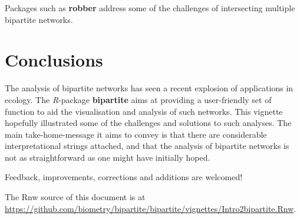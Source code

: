 \documentclass[a4paper, 11pt]{article}\usepackage[]{graphicx}\usepackage[dvipsnames]{xcolor}
\newcommand{\package}[1]{\textbf{#1}}
\newcommand{\proglang}[1]{\textsl{#1}}
\begin{document}
Packages such as \package{robber} address some of the challenges of intersecting multiple bipartite networks.

\section*{Conclusions}%
The analysis of bipartite networks has seen a recent explosion of applications in ecology. The \proglang{R}-package \package{bipartite} aims at providing a user-friendly set of function to aid the visualisation and analysis of such networks. This vignette hopefully illustrated some of the challenges and solutions to such analyses. The main take-home-message it aims to convey is that there are considerable interpretational strings attached, and that the analysis of bipartite networks is not as straightforward as one might have initially hoped.

\medskip
\noindent Feedback, improvements, corrections and additions are welcomed!







\bigskip

The Rnw source of this document is at \url{https://github.com/biometry/bipartite/bipartite/vignettes/Intro2bipartite.Rnw}.

\setlength{\bibsep}{0cm}
\def\bibfont{\small}


\printindex
\end{document}
